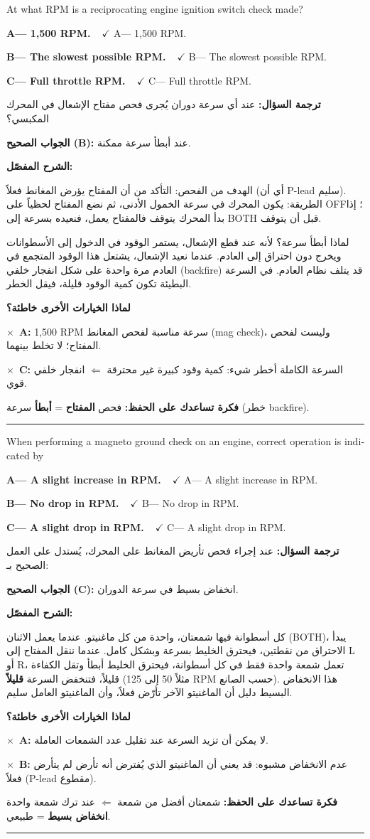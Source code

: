 \documentclass[11pt,a4paper]{article}
\newcommand{\en}[1]{\textenglish{#1}}
\newcommand{\correctletter}{}
\newcommand{\opt}[2]{%
  \ifdefstring{\correctletter}{#1}%
    {\textcolor{ansgreen}{\textbf{#1— #2\ \ $\checkmark$}}}%
    {#1— #2}\par}
\newcommand{\Q}[6]{%
  \renewcommand{\correctletter}{#6}%
  \par\bigskip
  \phantomsection\label{q#1}%
  \begin{tcolorbox}[enhanced,breakable,colback=qback,colframe=qframe,
      arc=2mm,boxrule=0.8pt,fonttitle=\bfseries,
      title={\en{Question #1}}]
    \begin{english}
      #2\par\smallskip
      \opt{A}{#3}\opt{B}{#4}\opt{C}{#5}
    \end{english}
  \end{tcolorbox}}
\newcommand{\tr}[1]{\textbf{\textcolor{qframe}{ترجمة السؤال:}} #1\par}
\newcommand{\ans}[2]{%
  \begin{tcolorbox}[colback=ansback,colframe=ansgreen,boxrule=0.6pt,arc=1.5mm,
      left=4pt,right=4pt,top=2pt,bottom=2pt]
    \textbf{\textcolor{ansgreen}{الجواب الصحيح (\en{#1}):}} #2
  \end{tcolorbox}}
\newcommand{\sharh}[1]{\textbf{\textcolor{conceptc}{الشرح المفصّل:}}\par #1\par}
\newcommand{\nohead}{\textbf{\textcolor{wrongc}{لماذا الخيارات الأخرى خاطئة؟}}\par}
\newcommand{\no}[2]{\hspace*{1em}\textcolor{wrongc}{$\times$}\ \textbf{\en{#1}:} #2\par}
\newcommand{\tip}[1]{%
  \begin{tcolorbox}[colback=tipback,colframe=tipframe,boxrule=0.5pt,arc=1.5mm,
      left=4pt,right=4pt,top=2pt,bottom=2pt]
    \textbf{فكرة تساعدك على الحفظ:} #1
  \end{tcolorbox}}
\newcommand{\qsep}{\par\medskip\noindent\textcolor{qframe!40}{\rule{\linewidth}{0.4pt}}\par}
\begin{document}
\Q{8608}{At what RPM is a reciprocating engine ignition switch check made?}
{1,500 RPM.}
{The slowest possible RPM.}
{Full throttle RPM.}{B}
\tr{عند أي سرعة دوران يُجرى فحص مفتاح الإشعال في المحرك المكبسي؟}
\ans{B}{عند أبطأ سرعة ممكنة.}
\sharh{الهدف من الفحص: التأكد من أن المفتاح يؤرض المغانط فعلاً (أي أن \en{P-lead} سليم). الطريقة: يكون المحرك في سرعة الخمول الأدنى، ثم نضع المفتاح لحظياً على \en{OFF}؛ إذا بدأ المحرك يتوقف فالمفتاح يعمل، فنعيده بسرعة إلى \en{BOTH} قبل أن يتوقف.

لماذا أبطأ سرعة؟ لأنه عند قطع الإشعال، يستمر الوقود في الدخول إلى الأسطوانات ويخرج دون احتراق إلى العادم. عندما نعيد الإشعال، يشتعل هذا الوقود المتجمع في العادم مرة واحدة على شكل انفجار خلفي (\en{backfire}) قد يتلف نظام العادم. في السرعة البطيئة تكون كمية الوقود قليلة، فيقل الخطر.}
\nohead
\no{A}{1,500 \en{RPM} سرعة مناسبة لفحص المغانط (\en{mag check})، وليست لفحص المفتاح؛ لا تخلط بينهما.}
\no{C}{السرعة الكاملة أخطر شيء: كمية وقود كبيرة غير محترقة $\Leftarrow$ انفجار خلفي قوي.}
\tip{فحص \textbf{المفتاح} = \textbf{أبطأ} سرعة (خطر \en{backfire}).}
\qsep

\Q{8583}{When performing a magneto ground check on an engine, correct operation is indicated by}
{A slight increase in RPM.}
{No drop in RPM.}
{A slight drop in RPM.}{C}
\tr{عند إجراء فحص تأريض المغانط على المحرك، يُستدل على العمل الصحيح بـ:}
\ans{C}{انخفاض بسيط في سرعة الدوران.}
\sharh{كل أسطوانة فيها شمعتان، واحدة من كل ماغنيتو. عندما يعمل الاثنان (\en{BOTH})، يبدأ الاحتراق من نقطتين، فيحترق الخليط بسرعة وبشكل كامل. عندما ننقل المفتاح إلى \en{L} أو \en{R}، تعمل شمعة واحدة فقط في كل أسطوانة، فيحترق الخليط أبطأ وتقل الكفاءة قليلاً، فتنخفض السرعة \textbf{قليلاً} (مثلاً 50 إلى 125 \en{RPM} حسب الصانع). هذا الانخفاض البسيط دليل أن الماغنيتو الآخر تأرّض فعلاً، وأن الماغنيتو العامل سليم.}
\nohead
\no{A}{لا يمكن أن تزيد السرعة عند تقليل عدد الشمعات العاملة.}
\no{B}{عدم الانخفاض مشبوه: قد يعني أن الماغنيتو الذي يُفترض أنه تأرض لم يتأرض فعلاً (\en{P-lead} مقطوع).}
\tip{شمعتان أفضل من شمعة $\Leftarrow$ عند ترك شمعة واحدة \textbf{انخفاض بسيط} = طبيعي.}
\qsep
\end{document}
